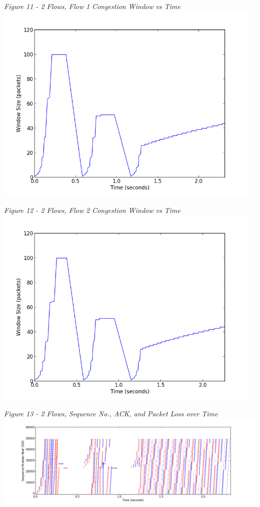 \documentclass[11pt]{article}
\begin{document}
\textit{Figure 11 - 2 Flows, Flow 1 Congestion Window vs Time}
\\
\includegraphics[width=13cm]{2_data/2_1-window}
\vspace{0.25cm}

\textit{Figure 12 - 2 Flows, Flow 2 Congestion Window vs Time}
\\
\includegraphics[width=13cm]{2_data/2_2-window}
\vspace{0.25cm}

\textit{Figure 13 - 2 Flows, Sequence No., ACK, and Packet Loss over Time}
\\
\includegraphics[width=18cm]{2_data/2-sequence}
\vspace{0.25cm}
\end{document}
